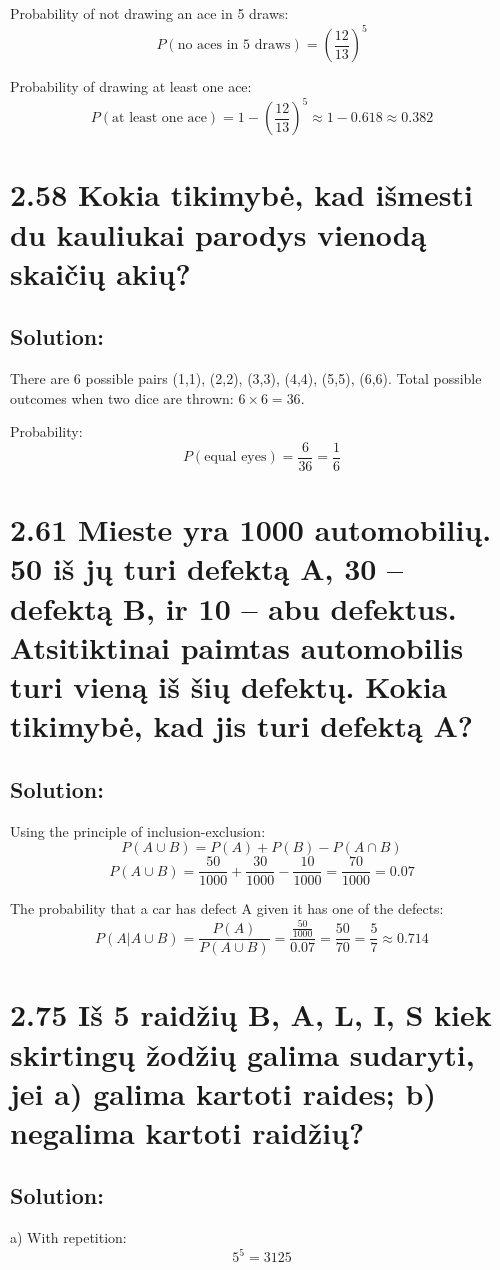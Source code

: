 \documentclass{article}
\begin{document}
{Probability of not drawing an ace in 5 draws:
\[
P(\text{no aces in 5 draws}) = \left(\frac{12}{13}\right)^5
\]

Probability of drawing at least one ace:
\[
P(\text{at least one ace}) = 1 - \left(\frac{12}{13}\right)^5 \approx 1 - 0.618 \approx 0.382
\]

\section*{2.58 Kokia tikimybė, kad išmesti du kauliukai parodys vienodą skaičių akių?}
\subsection*{Solution:}
There are 6 possible pairs (1,1), (2,2), (3,3), (4,4), (5,5), (6,6).
Total possible outcomes when two dice are thrown: \(6 \times 6 = 36\).

Probability:
\[
P(\text{equal eyes}) = \frac{6}{36} = \frac{1}{6}
\]

\section*{2.61 Mieste yra 1000 automobilių. 50 iš jų turi defektą A, 30 – defektą B, ir 10 – abu defektus. Atsitiktinai paimtas automobilis turi vieną iš šių defektų. Kokia tikimybė, kad jis turi defektą A?}
\subsection*{Solution:}
Using the principle of inclusion-exclusion:
\[
P(A \cup B) = P(A) + P(B) - P(A \cap B)
\]
\[
P(A \cup B) = \frac{50}{1000} + \frac{30}{1000} - \frac{10}{1000} = \frac{70}{1000} = 0.07
\]

The probability that a car has defect A given it has one of the defects:
\[
P(A | A \cup B) = \frac{P(A)}{P(A \cup B)} = \frac{\frac{50}{1000}}{0.07} = \frac{50}{70} = \frac{5}{7} \approx 0.714
\]

\section*{2.75 Iš 5 raidžių B, A, L, I, S kiek skirtingų žodžių galima sudaryti, jei a) galima kartoti raides; b) negalima kartoti raidžių?}
\subsection*{Solution:}
a) With repetition:
\[
5^5 = 3125
\]

}
\end{document}
